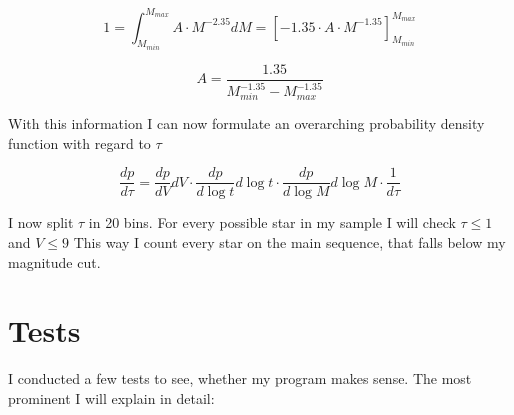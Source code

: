\documentclass[a4paper,10pt]{article}
\begin{document}
 \begin{equation}
  1=\int_{M_{min}}^{M_{max}}A\cdot M^{-2.35} dM =\left[ -1.35\cdot A\cdot M^{-1.35}\right]_{M_{min}}^{M_{max}}
 \end{equation}
 
 \begin{equation}
  A= \frac{1.35}{M_{min}^{-1.35}-M_{max}^{-1.35}}
 \end{equation}
 
 With this information I can now formulate an overarching probability density function with regard to $\tau$
 
 \begin{equation}
  \frac{dp}{d\tau}=\frac{dp}{dV}dV \cdot \frac{dp}{d\log t}d\log t \cdot \frac{dp}{d\log M}d\log M\cdot \frac{1}{d\tau}
 \end{equation}
 
 I now split $\tau$ in 20 bins. For every possible star in my sample I will check $\tau\le 1$ and $V\le 9$ This way I count every
 star on the main sequence, that falls below my magnitude cut. 
 
 \newpage
 \section{Tests}
 I conducted a few tests to see, whether my program makes sense. The most prominent I will explain in detail:
 
\end{document}
